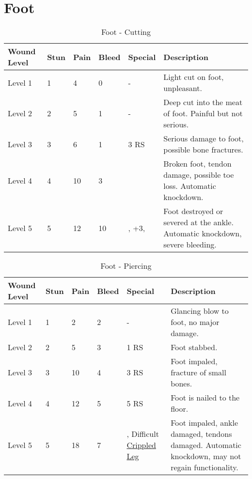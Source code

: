 \documentclass[oneside,11pt,english]{book}
\begin{document}
\section{Foot}\vspace{-25pt} \label{sec:foot}
\begin{table}[hb] %
	\caption{Foot - Cutting}
	\label{wound:Foot - Cutting}
	\begin{tabu} to 
Wound Level &Stun &Pain &Bleed &Special &Description\\\toprule
Level 1& 1& 4& 0& - &Light cut on foot, unpleasant.\\
Level 2& 2& 5& 1& - &Deep cut into the meat of foot. Painful but not serious.\\
Level 3& 3& 6& 1&  3 RS &Serious damage to foot, possible bone fractures.\\
Level 4& 4& 10& 3&  &Broken foot, tendon damage, possible toe loss. Automatic knockdown.\\
Level 5& 5& 12& 10& , \newline
	 +3, \newline
	 &Foot destroyed or severed at the ankle. Automatic knockdown, severe bleeding.\\
	\end{tabu}
\end{table}

\begin{table}[hb] %
	\caption{Foot - Piercing}
	\label{wound:Foot - Piercing}
	\begin{tabu} to 
Wound Level &Stun &Pain &Bleed &Special &Description\\\toprule
Level 1& 1& 2& 2& - &Glancing blow to foot, no major damage.\\
Level 2& 2& 5& 3&  1 RS &Foot stabbed.\\
Level 3& 3& 10&4&  3 RS &Foot impaled, fracture of small bones.\\
Level 4& 4& 12&5&  5 RS &Foot is nailed to the floor.\\
Level 5& 5& 18&7& , \newline
	Difficult~ \hyperref[bane:Crippled Limb/Appendage]{Crippled Leg} &Foot impaled, ankle damaged, tendons damaged. Automatic knockdown, may not regain functionality.\\
	\end{tabu}
\end{table}
\end{document}
